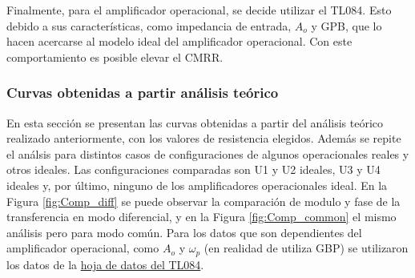 Finalmente, para el amplificador operacional, se decide utilizar el TL084. Esto debido a sus caracter\'isticas, como impedancia de entrada, $A_o$ y GPB, que lo hacen acercarse al modelo ideal del amplificador operacional. Con este comportamiento es posible elevar el CMRR. 

\subsubsection{Curvas obtenidas a partir an\'alisis te\'orico }
En esta secci\'on se presentan las curvas obtenidas a partir del an\'alisis te\'orico realizado anteriormente, con los valores de resistencia elegidos. Adem\'as se repite el an\'alsis para distintos casos de configuraciones de algunos operacionales reales y otros ideales. Las configuraciones comparadas son U1 y U2 ideales, U3 y U4 ideales y, por \'ultimo, ninguno de los amplificadores operacionales ideal. 
En la Figura \ref{fig:Comp_diff} se puede observar la comparaci\'on de modulo y fase de la transferencia en modo diferencial, y en la Figura \ref{fig:Comp_common} el mismo an\'alisis pero para modo com\'un.
Para los datos que son dependientes del amplificador operacional, como $A_o$ y $\omega_p$ (en realidad de utiliza GBP) se utilizaron los datos de la \href{https://www.egr.msu.edu/eceshop/Parts_Inventory/datasheets/tl084cn.pdf}{hoja de datos del TL084}. 

